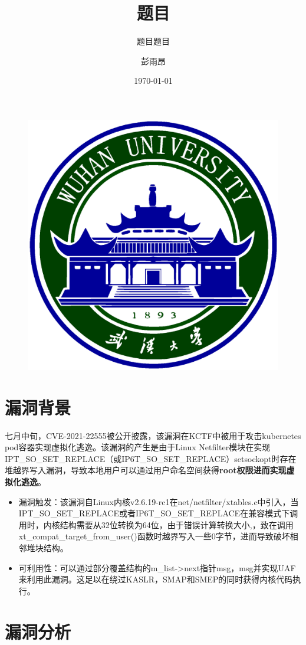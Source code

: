 \documentclass[xcolor=table]{beamer}
\author{彭雨昂}
\title{题目}
\subtitle{题目题目}
\institute{武汉大学国家网络安全学院}
\date{\today}
\begin{document}
\kaishu
\begin{frame}
	\titlepage
	\begin{figure}[htpb]
		\begin{center}
			\includegraphics[width=0.2\linewidth]{pic/whulogo.eps}
		\end{center}
	\end{figure}
\end{frame}
\begin{frame}
\tableofcontents[sectionstyle=show,subsectionstyle=show/shaded/hide,subsubsectionstyle=show/shaded/hide]
\end{frame}


\section{漏洞背景}

\begin{frame}
\small {七月中旬，CVE-2021-22555被公开披露，该漏洞在KCTF中被用于攻击kubernetes pod容器实现虚拟化逃逸。该漏洞的产生是由于Linux Netfilter模块在实现IPT\_SO\_SET\_REPLACE（或IP6T\_SO\_SET\_REPLACE）setsockopt时存在堆越界写入漏洞，导致本地用户可以通过用户命名空间获得\textbf{root权限进而实现虚拟化逃逸}。}

\footnotesize{\begin{itemize}
	\item  漏洞触发：该漏洞自Linux内核v2.6.19-rc1在net/netfilter/xtables.c中引入，当IPT\_SO\_SET\_REPLACE或者IP6T\_SO\_SET\_REPLACE在兼容模式下调用时，内核结构需要从32位转换为64位，由于错误计算转换大小,，致在调用xt\_compat\_target\_from\_user()函数时越界写入一些0字节，进而导致破坏相邻堆块结构。
	\item 可利用性：可以通过部分覆盖结构的m\_list->next指针msg，msg并实现UAF来利用此漏洞。这足以在绕过KASLR，SMAP和SMEP的同时获得内核代码执行。
\end{itemize}}

\end{frame}



\section{漏洞分析}
\end{document}
